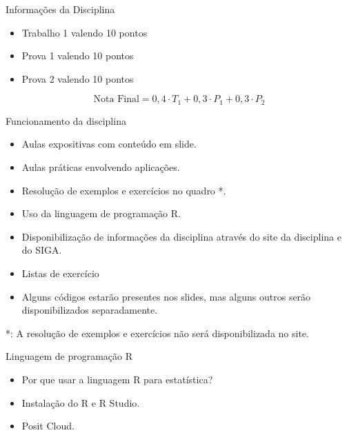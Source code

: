 \documentclass{beamer}
\begin{document}
\begin{frame}{Informações da Disciplina}
\begin{itemize}
    \item Trabalho 1 valendo 10 pontos 
    \item Prova 1 valendo 10 pontos 
    \item Prova 2 valendo 10 pontos 
\end{itemize}


$$\text{Nota Final} = 0,4 \cdot T_1 + 0,3 \cdot P_1 + 0,3 \cdot P_2$$

\end{frame}
\begin{frame}{Funcionamento da disciplina}
    \begin{itemize}
        \item Aulas expositivas com conteúdo em slide. 
        \item Aulas práticas envolvendo aplicações. 
        \item Resolução de exemplos e exercícios no quadro *.
        \item Uso da linguagem de programação R.
        \item Disponibilização de informações da disciplina através do site da disciplina e do SIGA. 
        \item Listas de exercício
        \item Alguns códigos estarão presentes nos slides, mas alguns outros serão disponibilizados separadamente.
    \end{itemize}
    *: A resolução de exemplos e exercícios não será disponibilizada no site.
\end{frame}

\begin{frame}{Linguagem de programação R}
    \begin{itemize}
        \item Por que usar a linguagem R para estatística?
        \item Instalação do R e R Studio. 
        \item Posit Cloud. 
    \end{itemize}
\end{frame}



%
\end{document}
